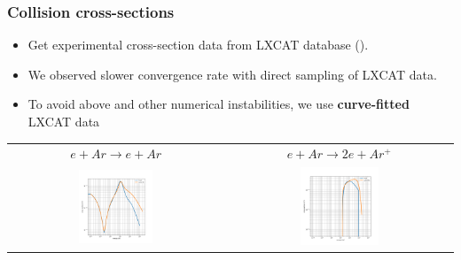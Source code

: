 \documentclass[mathserif, aspectratio=169]{beamer}
\begin{document}
\begin{frame}
	\frametitle{Collision cross-sections}
	\begin{itemize}
		\item Get experimental cross-section data from LXCAT database (). 
		\item We observed slower convergence rate with direct sampling of LXCAT data. 
		\item To avoid above and other numerical instabilities, we use \textbf{curve-fitted} LXCAT data%
	\end{itemize}
	\begin{center}
		\begin{tabular}{cc}
			$e + Ar \rightarrow e + Ar $ & $e + Ar \rightarrow 2e + Ar^+ $ \\
			\includegraphics[width=0.36\textwidth]{fig/g0.png} &  \includegraphics[width=0.36\textwidth]{fig/g2.png}
		\end{tabular}	
	\end{center}
\end{frame}
\end{document}
